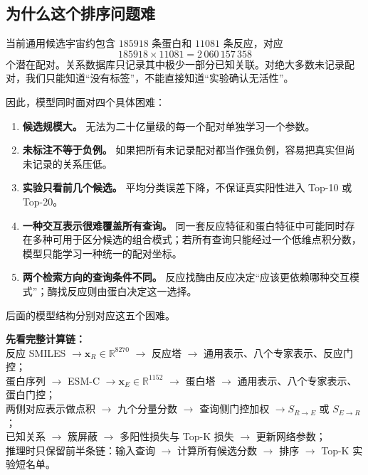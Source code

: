 \documentclass[UTF8,11pt,a4paper]{ctexart}
\begin{document}
\subsection{为什么这个排序问题难}

当前通用候选宇宙约包含 $185918$ 条蛋白和 $11081$ 条反应，对应
\begin{equation}
185918\times11081=2\,060\,157\,358
\end{equation}
个潜在配对。关系数据库只记录其中极少一部分已知关联。对绝大多数未记录配对，我们只能知道“没有标签”，不能直接知道“实验确认无活性”。

因此，模型同时面对四个具体困难：

\begin{enumerate}[label=\textbf{D\arabic*.}]
\item \textbf{候选规模大。} 无法为二十亿量级的每一个配对单独学习一个参数。
\item \textbf{未标注不等于负例。} 如果把所有未记录配对都当作强负例，容易把真实但尚未记录的关系压低。
\item \textbf{实验只看前几个候选。} 平均分类误差下降，不保证真实阳性进入 Top-10 或 Top-20。
\item \textbf{一种交互表示很难覆盖所有查询。} 同一套反应特征和蛋白特征中可能同时存在多种可用于区分候选的组合模式；若所有查询只能经过一个低维点积分数，模型只能学习一种统一的配对坐标。
\item \textbf{两个检索方向的查询条件不同。} 反应找酶由反应决定“应该更依赖哪种交互模式”；酶找反应则由蛋白决定这一选择。
\end{enumerate}

后面的模型结构分别对应这五个困难。

\begin{keybox}
\textbf{先看完整计算链：}\\[0.3em]
反应 SMILES $\rightarrow \bm x_R\in\mathbb R^{8270}$ $\rightarrow$ 反应塔 $\rightarrow$ 通用表示、八个专家表示、反应门控；\\
蛋白序列 $\rightarrow$ ESM-C $\rightarrow \bm x_E\in\mathbb R^{1152}$ $\rightarrow$ 蛋白塔 $\rightarrow$ 通用表示、八个专家表示、蛋白门控；\\
两侧对应表示做点积 $\rightarrow$ 九个分量分数 $\rightarrow$ 查询侧门控加权 $\rightarrow S_{R\rightarrow E}$ 或 $S_{E\rightarrow R}$；\\
已知关系 $\rightarrow$ 簇屏蔽 $\rightarrow$ 多阳性损失与 Top-K 损失 $\rightarrow$ 更新网络参数；\\
推理时只保留前半条链：输入查询 $\rightarrow$ 计算所有候选分数 $\rightarrow$ 排序 $\rightarrow$ Top-K 实验短名单。
\end{keybox}
\end{document}
